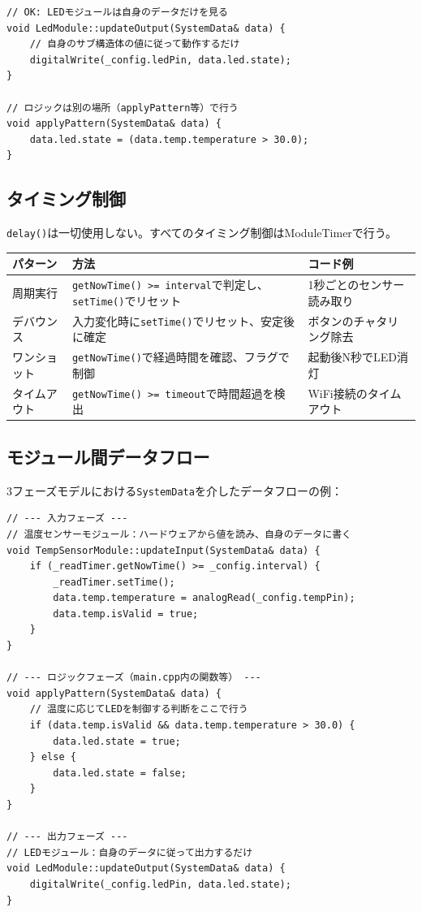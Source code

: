 \begin{lstlisting}[style=cppstyle, caption={正しい実装：出力モジュールは自身のSystemDataのみ参照}]
// OK: LEDモジュールは自身のデータだけを見る
void LedModule::updateOutput(SystemData& data) {
    // 自身のサブ構造体の値に従って動作するだけ
    digitalWrite(_config.ledPin, data.led.state);
}

// ロジックは別の場所（applyPattern等）で行う
void applyPattern(SystemData& data) {
    data.led.state = (data.temp.temperature > 30.0);
}
\end{lstlisting}

\subsection{タイミング制御}

\texttt{delay()}は一切使用しない。すべてのタイミング制御はModuleTimerで行う。

\begin{tabularx}{\textwidth}{l l X}
\toprule
\textbf{パターン} & \textbf{方法} & \textbf{コード例} \\
\midrule
周期実行 &
\texttt{getNowTime() >= interval}で判定し、\texttt{setTime()}でリセット &
1秒ごとのセンサー読み取り \\
デバウンス &
入力変化時に\texttt{setTime()}でリセット、安定後に確定 &
ボタンのチャタリング除去 \\
ワンショット &
\texttt{getNowTime()}で経過時間を確認、フラグで制御 &
起動後N秒でLED消灯 \\
タイムアウト &
\texttt{getNowTime() >= timeout}で時間超過を検出 &
WiFi接続のタイムアウト \\
\bottomrule
\end{tabularx}

\subsection{モジュール間データフロー}

3フェーズモデルにおける\texttt{SystemData}を介したデータフローの例：

\begin{lstlisting}[style=cppstyle, caption={3フェーズモデルによるデータフロー}]
// --- 入力フェーズ ---
// 温度センサーモジュール：ハードウェアから値を読み、自身のデータに書く
void TempSensorModule::updateInput(SystemData& data) {
    if (_readTimer.getNowTime() >= _config.interval) {
        _readTimer.setTime();
        data.temp.temperature = analogRead(_config.tempPin);
        data.temp.isValid = true;
    }
}

// --- ロジックフェーズ（main.cpp内の関数等） ---
void applyPattern(SystemData& data) {
    // 温度に応じてLEDを制御する判断をここで行う
    if (data.temp.isValid && data.temp.temperature > 30.0) {
        data.led.state = true;
    } else {
        data.led.state = false;
    }
}

// --- 出力フェーズ ---
// LEDモジュール：自身のデータに従って出力するだけ
void LedModule::updateOutput(SystemData& data) {
    digitalWrite(_config.ledPin, data.led.state);
}
\end{lstlisting}

